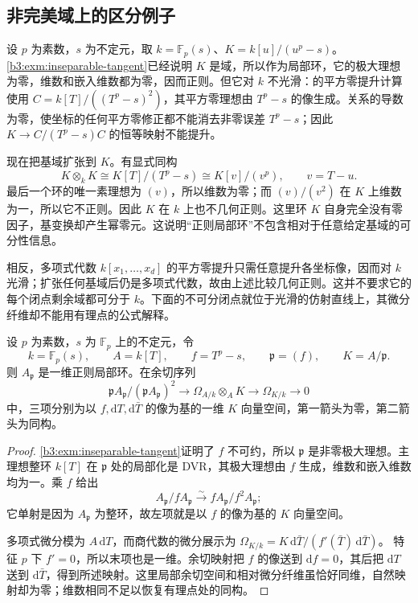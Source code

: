 \subsection{非完美域上的区分例子}
\label{b3:subsec:1805:03}

设 \(p\) 为素数，\(s\) 为不定元，取 \(k=\mathbb F_p(s)\)、\(K=k[u]/(u^p-s)\)。\cref{b3:exm:inseparable-tangent}已经说明 \(K\) 是域，所以作为局部环，它的极大理想为零，维数和嵌入维数都为零，因而正则。但它对 \(k\) 不光滑：的平方零提升计算使用 \(C=k[T]/((T^p-s)^2)\)，其平方零理想由 \(T^p-s\) 的像生成。关系的导数为零，使坐标的任何平方零修正都不能消去非零误差 \(T^p-s\)；因此 \(K\to C/(T^p-s)C\) 的恒等映射不能提升。

\ProseParagraphBreak
现在把基域扩张到 \(K\)。有显式同构
\[
	K\otimes_kK\cong K[T]/(T^p-s) \cong K[v]/(v^p),\qquad v=T-u.
\]
最后一个环的唯一素理想为 \((v)\)，所以维数为零；而 \((v)/(v^2)\) 在 \(K\) 上维数为一，所以它不正则。因此 \(K\) 在 \(k\) 上也不几何正则。这里环 \(K\) 自身完全没有零因子，基变换却产生幂零元。这说明“正则局部环”不包含相对于任意给定基域的可分性信息。

\ProseParagraphBreak
相反，多项式代数 \(k[x_1,\ldots,x_d]\) 的平方零提升只需任意提升各坐标像，因而对 \(k\) 光滑；扩张任何基域后仍是多项式代数，故由上述比较几何正则。这并不要求它的每个闭点剩余域都可分于 \(k\)。下面的不可分闭点就位于光滑的仿射直线上，其微分纤维却不能用有理点的公式解释。

\begin{proposition}\label{b3:prop:inseparable-cotangent-fiber}
	设 \(p\) 为素数，\(s\) 为 \(\mathbb F_p\) 上的不定元，令
	\[
		k=\mathbb F_p(s),\qquad A=k[T],\qquad f=T^p-s,\qquad\mathfrak p=(f),\qquad K=A/\mathfrak p.
	\]
	则 \(A_{\mathfrak p}\) 是一维正则局部环。在余切序列
	\[
		\mathfrak pA_{\mathfrak p}/(\mathfrak pA_{\mathfrak p})^2 \longrightarrow \Omega_{A/k}\otimes_AK \longrightarrow\Omega_{K/k}\longrightarrow0
	\]
	中，三项分别为以 \(f,\mathrm{d}T,\mathrm{d}\bar T\) 的像为基的一维 \(K\) 向量空间，第一箭头为零，第二箭头为同构。
\end{proposition}
\begin{proof}
	\cref{b3:exm:inseparable-tangent}证明了 \(f\) 不可约，所以 \(\mathfrak p\) 是非零极大理想。主理想整环 \(k[T]\) 在 \(\mathfrak p\) 处的局部化是 DVR，其极大理想由 \(f\) 生成，维数和嵌入维数均为一。乘 \(f\) 给出
	\[
		A_{\mathfrak p}/fA_{\mathfrak p} \xrightarrow{\sim} fA_{\mathfrak p}/f^2A_{\mathfrak p};
	\]
	它单射是因为 \(A_{\mathfrak p}\) 为整环，故左项就是以 \(f\) 的像为基的 \(K\) 向量空间。

	多项式微分模为 \(A\,\mathrm{d}T\)，而商代数的微分展示为 \(\Omega_{K/k}=K\,\mathrm{d}\bar T/(f'(\bar T)\,\mathrm{d}\bar T)\)。 特征 \(p\) 下 \(f'=0\)，所以末项也是一维。余切映射把 \(f\) 的像送到 \(\mathrm{d}f=0\)，其后把 \(\mathrm{d}T\) 送到 \(\mathrm{d}\bar T\)，得到所述映射。这里局部余切空间和相对微分纤维虽恰好同维，自然映射却为零；维数相同不足以恢复有理点处的同构。
\end{proof}
